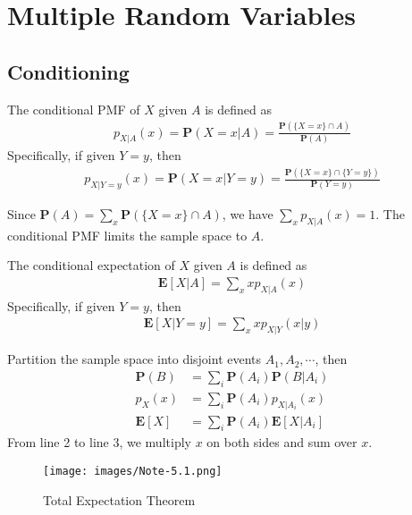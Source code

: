 \chapter{Multiple Random Variables}
\section{Conditioning}
\begin{definition}
    The conditional PMF of $X$ given $A$ is defined as
    \begin{align}
        p_{X|A}(x) = \mathbf{P}(X = x | A) = \frac{\mathbf{P}(\{X = x\} \cap A)}{\mathbf{P}(A)}
    \end{align}
    Specifically, if given $Y = y$, then
    \begin{align}
        p_{X|Y = y}(x) = \mathbf{P}(X = x | Y = y) = \frac{\mathbf{P}(\{X = x\} \cap \{Y = y\})}{\mathbf{P}(Y = y)}
    \end{align}
\end{definition}
Since $\mathbf{P}(A) = \sum_{x} \mathbf{P}(\{X = x\} \cap A)$, we have $\sum_{x} p_{X|A}(x) = 1$.
The conditional PMF limits the sample space to $A$.
\begin{definition}
    The conditional expectation of $X$ given $A$ is defined as
    \begin{align}
        \mathbf{E}[X|A] = \sum_{x} x p_{X|A}(x)
    \end{align}
    Specifically, if given $Y = y$, then
    \begin{align}
        \mathbf{E}[X|Y = y] = \sum_{x} x p_{X|Y}(x|y)
    \end{align}
\end{definition}
\begin{theorem}
    Partition the sample space into disjoint events $A_{1}, A_{2}, \cdots$, then
    \begin{equation}
    \begin{aligned}
        \mathbf{P}(B) &= \sum_{i} \mathbf{P}(A_{i}) \mathbf{P}(B|A_{i}) \\ 
        p_{X}(x) &= \sum_{i} \mathbf{P}(A_{i}) p_{X|A_{i}}(x) \\
        \mathbf{E}[X] &= \sum_{i} \mathbf{P}(A_{i}) \mathbf{E}[X|A_{i}]
    \end{aligned}
    \end{equation}
    From line 2 to line 3, we multiply $x$ on both sides and sum over $x$.
    \begin{figure}[H]
        \centering
        \texttt{[image: images/Note-5.1.png]}
        \caption{Total Expectation Theorem}
    \end{figure}
\end{theorem}
